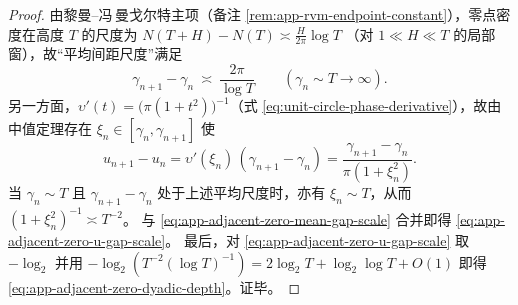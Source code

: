 \begin{proof}
由黎曼--冯\,曼戈尔特主项（备注 \ref{rem:app-rvm-endpoint-constant}），零点密度在高度 \(T\) 的尺度为
\(
N(T+H)-N(T)\asymp \frac{H}{2\pi}\log T
\)
（对 \(1\ll H\ll T\) 的局部窗），故“平均间距尺度”满足
\begin{equation}\label{eq:app-adjacent-zero-mean-gap-scale}
\gamma_{n+1}-\gamma_n\ \asymp\ \frac{2\pi}{\log T}
\qquad(\gamma_n\sim T\to\infty).
\end{equation}
另一方面，\(\upsilon'(t)=\bigl(\pi(1+t^2)\bigr)^{-1}\)（式 \eqref{eq:unit-circle-phase-derivative}），故由中值定理存在 \(\xi_n\in[\gamma_n,\gamma_{n+1}]\) 使
\[
u_{n+1}-u_n=\upsilon'(\xi_n)\,(\gamma_{n+1}-\gamma_n)
=\frac{\gamma_{n+1}-\gamma_n}{\pi(1+\xi_n^{2})}.
\]
当 \(\gamma_n\sim T\) 且 \(\gamma_{n+1}-\gamma_n\) 处于上述平均尺度时，亦有 \(\xi_n\sim T\)，从而 \((1+\xi_n^2)^{-1}\asymp T^{-2}\)。
与 \eqref{eq:app-adjacent-zero-mean-gap-scale} 合并即得 \eqref{eq:app-adjacent-zero-u-gap-scale}。
最后，对 \eqref{eq:app-adjacent-zero-u-gap-scale} 取 \(-\log_2\) 并用 \(-\log_2(T^{-2}(\log T)^{-1})=2\log_2 T+\log_2\log T+O(1)\) 即得 \eqref{eq:app-adjacent-zero-dyadic-depth}。证毕。
\end{proof}
